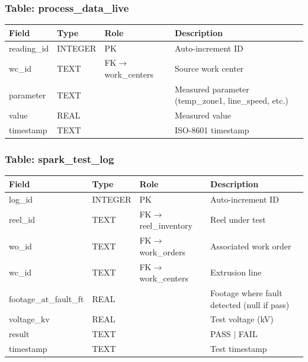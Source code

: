 \documentclass[11pt]{article}
\begin{document}
\subsubsection*{Table: process\_data\_live}
\begin{table}[H]\centering\small
\begin{tabular}{@{} l l l L{6cm} @{}}
\toprule
\textbf{Field} & \textbf{Type} & \textbf{Role} & \textbf{Description} \\
\midrule
reading\_id & INTEGER & PK  & Auto-increment ID \\
wc\_id      & TEXT    & FK$\to$work\_centers & Source work center \\
parameter   & TEXT    &     & Measured parameter (temp\_zone1, line\_speed, etc.) \\
value       & REAL    &     & Measured value \\
timestamp   & TEXT    &     & ISO-8601 timestamp \\
\bottomrule
\end{tabular}
\end{table}

\subsubsection*{Table: spark\_test\_log}
\begin{table}[H]\centering\small
\begin{tabular}{@{} l l l L{5.5cm} @{}}
\toprule
\textbf{Field} & \textbf{Type} & \textbf{Role} & \textbf{Description} \\
\midrule
log\_id          & INTEGER & PK  & Auto-increment ID \\
reel\_id         & TEXT    & FK$\to$reel\_inventory & Reel under test \\
wo\_id           & TEXT    & FK$\to$work\_orders & Associated work order \\
wc\_id           & TEXT    & FK$\to$work\_centers & Extrusion line \\
footage\_at\_fault\_ft & REAL & & Footage where fault detected (null if pass) \\
voltage\_kv      & REAL    &     & Test voltage (kV) \\
result           & TEXT    &     & PASS $\mid$ FAIL \\
timestamp        & TEXT    &     & Test timestamp \\
\bottomrule
\end{tabular}
\end{table}
\end{document}
